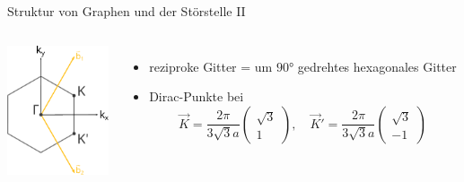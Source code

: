 \documentclass[aspectratio=1610, 9pt]{beamer}
\begin{document}
\begin{frame}{Struktur von Graphen und der Störstelle II}
\begin{columns}
    \centering
    \includegraphics[width=3cm]{Plots/graphene_first_brillouine_zone.pdf}
    \vspace*{-0.2cm}
    \begin{itemize}
      \item reziproke Gitter = um $90°$ gedrehtes hexagonales Gitter 
      \item Dirac-Punkte bei
    \begin{equation*}
      \vec{K}  = \frac{2\pi}{3\sqrt{3}a} \begin{pmatrix}  \sqrt{3}\\[4pt]  1   \end{pmatrix}, \quad
      \vec{K}' = \frac{2\pi}{3\sqrt{3}a} \begin{pmatrix}  \sqrt{3}\\[4pt]  -1  \end{pmatrix} 
    \end{equation*}
  \end{itemize}
\end{columns} 
\end{frame}
\end{document}
